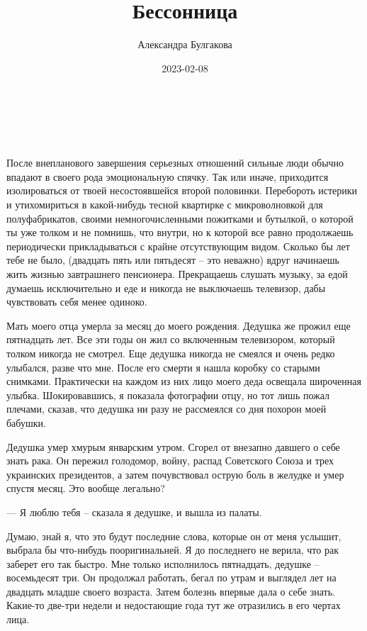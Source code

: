 \documentclass[
]{book}
\title{Бессонница}
\author{Александра Булгакова}
\date{2023-02-08}
\begin{document}
\maketitle

{
\setcounter{tocdepth}{1}
\tableofcontents
}
\hypertarget{section}{%
\chapter{~}\label{section}}

После внепланового завершения серьезных отношений сильные люди обычно впадают в своего рода эмоциональную спячку. Так или иначе, приходится изолироваться от твоей несостоявшейся второй половинки. Перебороть истерики и утихомириться в какой-нибудь тесной квартирке с микроволновкой для полуфабрикатов, своими немногочисленными пожитками и бутылкой, о которой ты уже толком и не помнишь, что внутри, но к которой все равно продолжаешь периодически прикладываться с крайне отсутствующим видом. Сколько бы лет тебе не было, (двадцать пять или пятьдесят -- это неважно) вдруг начинаешь жить жизнью завтрашнего пенсионера. Прекращаешь слушать музыку, за едой думаешь исключительно и еде и никогда не выключаешь телевизор, дабы чувствовать себя менее одиноко.

Мать моего отца умерла за месяц до моего рождения. Дедушка же прожил еще пятнадцать лет. Все эти годы он жил со включенным телевизором, который толком никогда не смотрел. Еще дедушка никогда не смеялся и очень редко улыбался, разве что мне. После его смерти я нашла коробку со старыми снимками. Практически на каждом из них лицо моего деда освещала широченная улыбка. Шокировавшись, я показала фотографии отцу, но тот лишь пожал плечами, сказав, что дедушка ни разу не рассмеялся со дня похорон моей бабушки.

Дедушка умер хмурым январским утром. Сгорел от внезапно давшего о себе знать рака. Он пережил голодомор, войну, распад Советского Союза и трех украинских президентов, а затем почувствовал острую боль в желудке и умер спустя месяц. Это вообще легально?

--- Я люблю тебя -- сказала я дедушке, и вышла из палаты.

Думаю, знай я, что это будут последние слова, которые он от меня услышит, выбрала бы что-нибудь пооригинальней. Я до последнего не верила, что рак заберет его так быстро. Мне только исполнилось пятнадцать, дедушке -- восемьдесят три. Он продолжал работать, бегал по утрам и выглядел лет на двадцать младше своего возраста. Затем болезнь впервые дала о себе знать. Какие-то две-три недели и недостающие года тут же отразились в его чертах лица.
\end{document}
